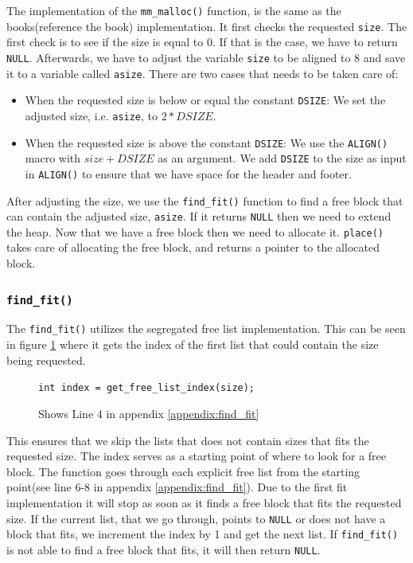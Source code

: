 \documentclass[11pt]{article}
\newcommand{\code}[1]{{\colorbox{lightgray!15}{\color{black}\texttt{#1}}}}
\newcommand{\temp}[1]{{\color{red}#1}}
\begin{document}
The implementation of the \code{mm\_malloc()} function, is the same as the books\temp{(reference the book)} implementation.
It first checks the requested \code{size}. The first check is to see if the size is equal to 0. If that is the case, we have to return \code{NULL}.
Afterwards, we have to adjust the variable \code{size} to be aligned to 8 and save it to a variable called \code{asize}. 
There are two cases that needs to be taken care of:
\begin{itemize}
    \item When the requested size is below or equal the constant \code{DSIZE}: We set the adjusted size, i.e. \code{asize}, to $2 * DSIZE$.
    \item When the requested size is above the constant \code{DSIZE}: We use the \code{ALIGN()} macro with $size + DSIZE$ as an argument. We add \code{DSIZE} to the size as input
    in \code{ALIGN()} to ensure that we have space for the header and footer.
\end{itemize}

After adjusting the size, we use the \code{find\_fit()} function to find a free block that can contain the adjusted size, \code{asize}. If it returns \code{NULL} then we need to extend the
heap. 
Now that we have a free block then we need to allocate it. 
\code{place()} takes care of allocating the free block, and returns a pointer to the allocated block.

\subsubsection{\code{find\_fit()}}

The \code{find\_fit()} utilizes the segregated free list implementation.
This can be seen in figure \ref{fig:get-list-index} where it gets the index of the first list that could contain the size being requested.
\begin{figure}[h]
    \code{int index = get\_free\_list\_index(size);}
    \centering
    \caption{Shows Line 4 in appendix \ref{appendix:find_fit}}
    \label{fig:get-list-index}
\end{figure}
This ensures that we skip the lists that does not contain sizes that fits the requested size. The index serves as a starting point
of where to look for a free block. The function goes through each explicit free list from the starting point(see line 6-8 in appendix \ref{appendix:find_fit}).
Due to the first fit implementation it will stop as soon as it finds a free block that fits the requested size. 
If the current list, that we go through, points to \code{NULL} or does not have a block that fits, we increment the index by 1 and get the next list.
If \code{find\_fit()} is not able to find a free block that fits, it will then return \code{NULL}.
\end{document}
